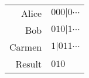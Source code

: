 \begin{tabular}{r|l}
     Alice & $000|0 \cdots $ \\
     Bob & $010|1 \cdots $ \\
     Carmen & $1|011 \cdots$ \\ \hline
     Result & $010$\\
\end{tabular}